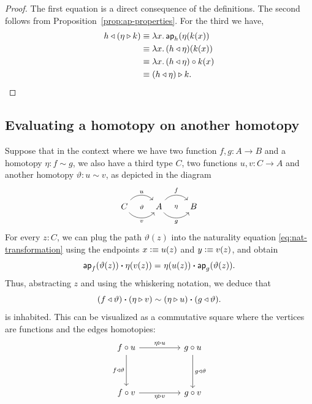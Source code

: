 \begin{proof}
    The first equation is a direct consequence of the definitions. The second follows from Proposition~\ref{prop:ap-properties}. For the third we have,
    \begin{align*}
        h\triangleleft(\eta\triangleright k)
            &\equiv\lambda x.\,\mathsf{ap}_h(\eta(k(x))\\
            &\equiv\lambda x.\,(h\triangleleft\eta)(k(x))\\
            &\equiv\lambda x.\,(h\triangleleft\eta)\circ k(x)\\
            &\equiv (h\triangleleft\eta)\triangleright k.
    \end{align*}
\end{proof}

\subsection{Evaluating a homotopy on another homotopy}\label{homotopy-evaluated-on-homotopy}
Suppose that in the context where we have two function $f,g\colon A\to B$ and a homotopy $\eta\colon f\sim g$, we also have a third type $C$, two functions $u,v\colon C\to A$ and another homotopy $\vartheta\colon u\sim v$, as depicted in the diagram
\[
    \begin{tikzcd}
        C
                \arrow[r,"u",bend left=49]
                \arrow[r,"v"',bend right=49]
                \arrow[r,"\scriptstyle\vartheta",phantom]
            &A
                \arrow[r,"f",bend left=49]
                \arrow[r,"g"',bend right=49]
                \arrow[r,"\scriptstyle\eta",phantom]
            &B
    \end{tikzcd}
\]
For every $z\colon C$, we can plug the path $\vartheta(z)$ into the naturality equation \eqref{eq:nat-transformation} using the endpoints $x\mathrel{\vcentcolon}\equiv u(z)$ and $y\mathrel{\vcentcolon}\equiv v(z)$, and obtain
\[
    \mathsf{ap}_f(\vartheta(z))\mathbin{\boldsymbol{\cdot}}\eta(v(z))
    \mathrel{=_{}}\eta(u(z))\mathbin{\boldsymbol{\cdot}}\mathsf{ap}_g(\vartheta(z)).
\]
Thus, abstracting $z$ and using the whiskering notation, we deduce that
\begin{equation}\label{eq:homotopy-evaluated-on-homotopy}
     (f\triangleleft \vartheta)\mathbin{\boldsymbol{\cdot}}(\eta\triangleright v)
     \sim
     (\eta\triangleright u)\mathbin{\boldsymbol{\cdot}}(g\triangleleft\vartheta).
\end{equation}
is inhabited. This can be visualized as a commutative square where the vertices are functions and the edges homotopies:
\begin{equation}\label{tik:homotopy-evaluated-on-homotopy}
    \begin{tikzcd}[column sep=huge,row sep=huge]
        f\circ u
            \arrow[r,"\eta\rwct u"]
            \arrow[d,"f\lwct \vartheta"'] &
        g\circ u
            \arrow[d,"g\lwct \vartheta"] \\
        f\circ v
            \arrow[r,"\eta\rwct v"'] &
        g\circ v
    \end{tikzcd}
\end{equation}


